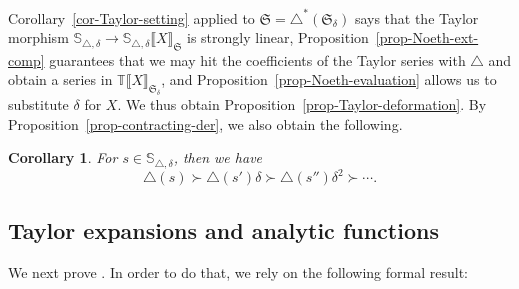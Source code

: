 \documentclass{article}
\newtheorem{corollary}[theorem]{Corollary}
\theoremstyle{remark}\newtheorem*{convention*}{Convention}
\begin{document}
Corollary~\ref{cor-Taylor-setting} applied to $\mathfrak{S}= \triangle^{\ast}
(\mathfrak{S}_{\delta})$ says that the Taylor morphism $\mathbb{S}_{\triangle,
\delta} \rightarrow \mathbb{S}_{\triangle, \delta} \llbracket X
\rrbracket_{\mathfrak{S}}$ is strongly linear, Proposition~\ref{prop-Noeth-ext-comp}
guarantees that we may hit the coefficients of the Taylor series with
$\triangle$ and obtain a series in $\mathbb{T} \llbracket X
\rrbracket_{\mathfrak{S}_{\delta}}$, and Proposition~\ref{prop-Noeth-evaluation} allows
us to substitute $\delta$ for $X$. We thus obtain
Proposition~\ref{prop-Taylor-deformation}. By Proposition~\ref{prop-contracting-der}, we
also obtain the following.

\begin{corollary}
  \label{cor-Taylor-descent}For $s \in \mathbb{S}_{\triangle, \delta}$, then
  we have
  \[ \triangle (s) \succ \triangle (s') \delta \succ \triangle (s'') \delta^2
     \succ \cdots . \]
\end{corollary}

\subsection{Taylor expansions and analytic functions}

We next prove . In order to do that, we rely on the
following formal result:
\end{document}
